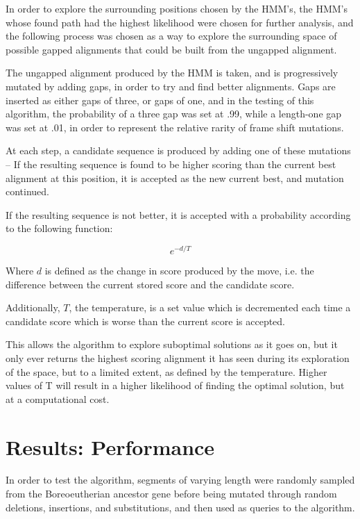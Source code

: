 \documentclass[12pt, conference]{IEEEtran}
\begin{document}
	In order to explore the surrounding positions chosen by the HMM's, the HMM's whose found path had the highest likelihood were chosen for further analysis, and the following process was chosen as a way to explore the surrounding space of possible gapped alignments that could be built from the ungapped alignment.
	
	The ungapped alignment produced by the HMM is taken, and is progressively mutated by adding gaps, in order to try and find better alignments. Gaps are inserted as either gaps of three, or gaps of one, and in the testing of this algorithm, the probability of a three gap was set at .99, while a length-one gap was set at .01, in order to represent the relative rarity of frame shift mutations.
	
	At each step, a candidate sequence is produced by adding one of these mutations -- If the resulting sequence is found to be higher scoring than the current best alignment at this position, it is accepted as the new current best, and mutation continued.
	
	If the resulting sequence is not better, it is accepted with a probability according to the following function:
	
	\begin{equation}
		e^{-d/T}
	\label{PAF}
	\end{equation}
	
	Where $d$ is defined as the change in score produced by the move, i.e. the difference between the current stored score and the candidate score.
	
	Additionally, $T$, the temperature, is a set value which is decremented each time a candidate score which is worse than the current score is accepted.
	
	This allows the algorithm to explore suboptimal solutions as it goes on, but it only ever returns the highest scoring alignment it has seen during its exploration of the space, but to a limited extent, as defined by the temperature. Higher values of T will result in a higher likelihood of finding the optimal solution, but at a computational cost.

\section{\textbf{Results: Performance}}

In order to test the algorithm, segments of varying length were randomly sampled from the Boreoeutherian ancestor gene before being mutated through random deletions, insertions, and substitutions, and then used as queries to the algorithm.
\end{document}
